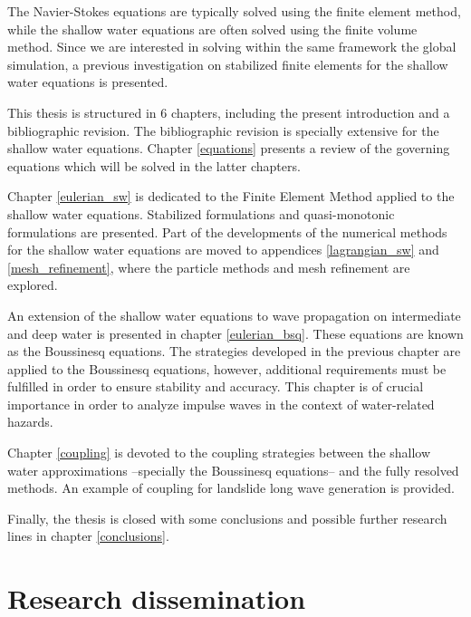 The Navier-Stokes equations are typically solved using the finite element method, while the shallow water equations are often solved using the finite volume method.
Since we are interested in solving within the same framework the global simulation, a previous investigation on stabilized finite elements for the shallow water equations is presented.


This thesis is structured in 6 chapters, including the present introduction and a bibliographic revision. The bibliographic revision is specially extensive for the shallow water equations.
Chapter \ref{equations} presents a review of the governing equations which will be solved in the latter chapters.

Chapter \ref{eulerian_sw} is dedicated to the Finite Element Method applied to the shallow water equations. Stabilized formulations and quasi-monotonic formulations are presented.
Part of the developments of the numerical methods for the shallow water equations are moved to appendices \ref{lagrangian_sw} and \ref{mesh_refinement}, where the particle methods and mesh refinement are explored.

An extension of the shallow water equations to wave propagation on intermediate and deep water is presented in chapter \ref{eulerian_bsq}. These equations are known as the Boussinesq equations. The strategies developed in the previous chapter are applied to the Boussinesq equations, however, additional requirements must be fulfilled in order to ensure stability and accuracy. This chapter is of crucial importance in order to analyze impulse waves in the context of water-related hazards.

Chapter \ref{coupling} is devoted to the coupling strategies between the shallow water approximations --specially the Boussinesq equations-- and the fully resolved methods. An example of coupling for landslide long wave generation is provided.

Finally, the thesis is closed with some conclusions and possible further research lines in chapter \ref{conclusions}.



\section{Research dissemination}


